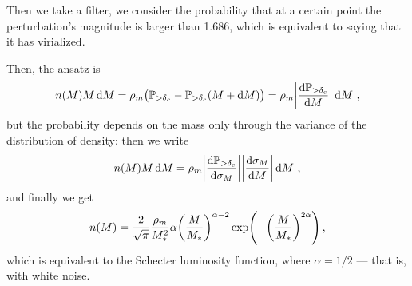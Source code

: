 \documentclass[main.tex]{subfiles}
\begin{document}
Then we take a filter, we consider the probability that at a certain point the perturbation's magnitude is larger than \num{1.686}, which is equivalent to saying that it has virialized. 

Then, the ansatz is 
%
\begin{align}
n(M) M \dd{M} = \rho_{m} \qty(\mathbb{P}_{> \delta_{c}} - \mathbb{P}_{ > \delta_{c}} (M + \dd{M}))
= \rho_{m} \abs{ \dv{\mathbb{P}_{> \delta_{c}}}{M}} \dd{M}
\,,
\end{align}
%
but the probability depends on the mass only through the variance of the distribution of density: then we write 
%
\begin{align}
n(M) M \dd{M} = \rho_{m} 
\abs{ \dv{\mathbb{P}_{> \delta_{c}}}{\sigma_{M}}}
\abs{ \dv{\sigma_{M}}{M}}
\dd{M}
\,,
\end{align}
%
and finally we get 
%
\begin{align}
n(M) = \frac{2}{\sqrt{\pi }} \frac{\rho_{m}}{M_*^2}  \alpha \qty( \frac{M}{M_{*}})^{\alpha -2} \exp( - \qty( \frac{M}{M_{*}})^{2\alpha } )
\,,
\end{align}
%
which is equivalent to the Schecter luminosity function, where \(\alpha = 1/2\) --- that is, with white noise.
\end{document}
